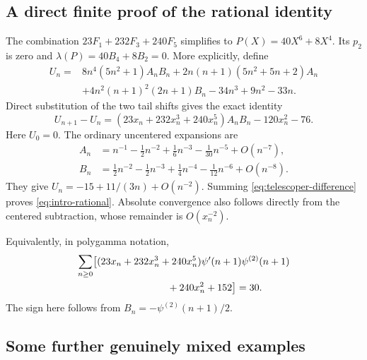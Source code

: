 \documentclass[11pt,letterpaper]{article}
\numberwithin{equation}{section}
\theoremstyle{definition}\newtheorem{definition}[theorem]{Definition}
\theoremstyle{remark}\newtheorem{remark}[theorem]{Remark}
\begin{document}
\subsection{A direct finite proof of the rational identity}

The combination $23F_1+232F_3+240F_5$ simplifies to
$P(X)=40X^6+8X^4$. Its $p_2$ is zero and
$\lambda(P)=40B_4+8B_2=0$. More explicitly, define
\begin{equation}\label{eq:telescoper}
\begin{split}
 U_n={}&8n^4(5n^2+1)A_nB_n
 +2n(n+1)(5n^2+5n+2)A_n\\
 &+4n^2(n+1)^2(2n+1)B_n-34n^3+9n^2-33n.
\end{split}
\end{equation}
Direct substitution of the two tail shifts gives the exact identity
\begin{equation}\label{eq:telescoper-difference}
 U_{n+1}-U_n=(23x_n+232x_n^3+240x_n^5)A_nB_n-120x_n^2-76.
\end{equation}
Here $U_0=0$. The ordinary uncentered expansions are
\begin{align*}
 A_n&=n^{-1}-\tfrac12n^{-2}+\tfrac16n^{-3}
                      -\tfrac1{30}n^{-5}+O(n^{-7}),\\
 B_n&=\tfrac12n^{-2}-\tfrac12n^{-3}+\tfrac14n^{-4}
                      -\tfrac1{12}n^{-6}+O(n^{-8}).
\end{align*}
They give $U_n=-15+11/(3n)+O(n^{-2})$. Summing
\eqref{eq:telescoper-difference} proves \eqref{eq:intro-rational}.
Absolute convergence also follows directly from the centered
subtraction, whose remainder is $O(x_n^{-2})$.

Equivalently, in polygamma notation,
\begin{equation}\label{eq:polygamma-rational}
\begin{split}
 \sum_{n\ge0}\bigl[&(23x_n+232x_n^3+240x_n^5)
                \psi'(n+1)\psi^{(2)}(n+1)\\
                &\hspace{25mm}+240x_n^2+152\bigr]=30.
\end{split}
\end{equation}
The sign here follows from $B_n=-\psi^{(2)}(n+1)/2$.

\subsection{Some further genuinely mixed examples}
\end{document}
